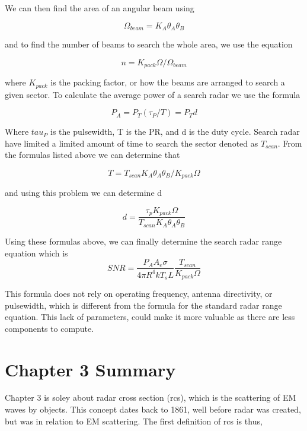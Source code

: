 \documentclass[12pt]{article}
\begin{document}
We can then find the area of an angular beam using 

\begin{equation}
    \Omega_{beam} = K_A \theta_A \theta_B
\end{equation}

and to find the number of beams to search the whole area, we use the equation

\begin{equation}
    n = K_{pack}\Omega / \Omega_{beam}
\end{equation}

where $K_{pack}$ is the packing factor, or how the beams are arranged to search a given sector. To calculate the average power of a search radar we use the formula

\begin{equation}
    P_A = P_T (\tau_P / T) = P_T d
\end{equation}

Where $tau_P$ is the pulsewidth, T is the PR, and d is the duty cycle. Search radar have limited a limited amount of time to search the sector denoted as $T_{scan}$. From the formulas listed above we can determine that 

\begin{equation}
    T = T_{scan} K_A \theta_A \theta_B / K_{pack} \Omega 
\end{equation}

and using this problem we can determine d

\begin{equation}
    d = \frac{\tau_p K_{pack} \Omega  }{T_{scan} K_A \theta_A \theta_B}
\end{equation}

Using these formulas above, we can finally determine the search radar range equation which is 
\begin{equation}
    SNR = \frac{ P_A A_e \sigma }{ 4 \pi R^4 k T_s L} \frac{T_{scan}}{K_{pack} \Omega  }
\end{equation}

This formula does not rely on operating frequency, antenna directivity, or pulsewidth, which is different from the formula for the standard radar range equation. This lack of parameters, could make it more valuable as there are less components to compute.

\section{Chapter 3 Summary}
Chapter 3 is soley about radar cross section (rcs), which is the scattering of EM waves by objects. This concept dates back to 1861, well before radar was created, but was in relation to EM scattering. The first definition of rcs is thus, 
\end{document}
